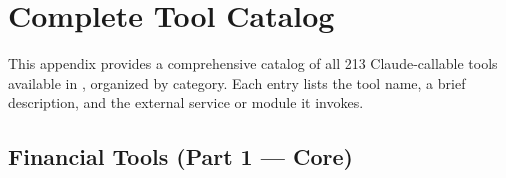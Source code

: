 \chapter{Complete Tool Catalog}
\label{app:tools}

This appendix provides a comprehensive catalog of all 213 Claude-callable tools available in \autoscholar, organized by category.
Each entry lists the tool name, a brief description, and the external service or module it invokes.

\section{Financial Tools (Part 1 --- Core)}
\label{sec:tools:fin-core}

